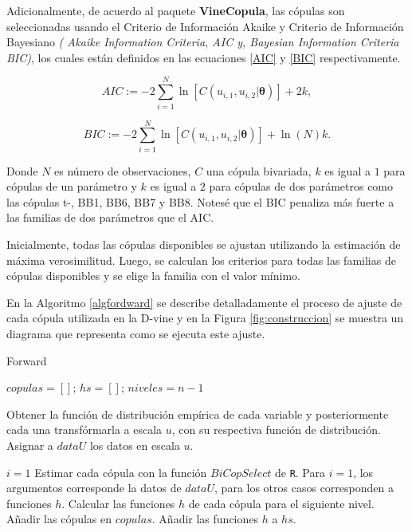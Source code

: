 Adicionalmente, de acuerdo al paquete \textbf{VineCopula}, las cópulas son seleccionadas usando el Criterio de Información Akaike y Criterio de Información Bayesiano \textit{( Akaike Information Criteria, AIC y, Bayesian Information Criteria BIC)}, los cuales están definidos en las ecuaciones \eqref{AIC} y \eqref{BIC} respectivamente.

\begin{equation}\label{AIC}
    AIC := -2 \sum_{i=1}^N \ln[C(u_{i,1},u_{i,2}|\boldsymbol{\theta})] + 2k,
\end{equation}

\begin{equation}\label{BIC}
    BIC := -2 \sum_{i=1}^N \ln[C(u_{i,1},u_{i,2}|\boldsymbol{\theta})] + \ln(N)k.
\end{equation}

Donde $N$ es número de observaciones, $C$ una cópula bivariada, $k$ es igual a $1$ para cópulas de un parámetro y $k$ es igual a $2$ para cópulas de dos parámetros como las cópulas t-, BB1, BB6, BB7 y BB8. Notesé que el BIC penaliza más fuerte a las familias de dos parámetros que el AIC.

Inicialmente, todas las cópulas disponibles se ajustan utilizando la estimación de máxima verosimilitud. Luego, se calculan los criterios para todas las familias de cópulas disponibles y se elige la familia con el valor mínimo.


En la Algoritmo \ref{algfordward} se describe detalladamente el proceso de ajuste de cada cópula utilizada en la D-vine y en la Figura \ref{fig:construccion} se muestra un diagrama que representa como se ejecuta este ajuste.

\begin{algorithm}[H]
      \caption{Forward}
      \label{algfordward}
      \begin{algorithmic}[1]  

        \State $copulas =  \left [  \right ]$; $hs =  \left [  \right ]$; $niveles = n-1$
        
        \State Obtener la función de distribución empírica de cada variable y posteriormente cada una transfórmarla a escala $u$, con su respectiva función de distribución. 
        \State Asignar a $dataU$ los datos en escala $u$.
        
        \State $i = 1$
          \State Estimar cada cópula con la función $BiCopSelect$ de \texttt{R}. Para $i = 1$, los argumentos corresponde la datos de $dataU$, para los otros casos corresponden a funciones $h$.
          \State Calcular las funciones $h$ de cada cópula para el siguiente nivel.
          \State Añadir las cópulas en $copulas$.
          \State Añadir las funciones $h$ a $hs$.
        \EndWhile
       
      \end{algorithmic}
    \end{algorithm}



